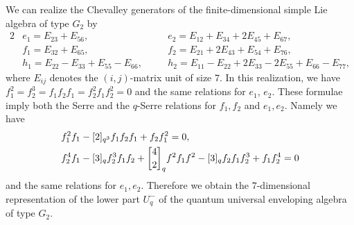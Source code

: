 \documentclass[12pt,a4paper]{article}
\theoremstyle{plain} %
\theoremstyle{definition} %
\theoremstyle{definition} %
\numberwithin{theorem}{section}
\numberwithin{equation}{section}
\numberwithin{figure}{section}
\numberwithin{table}{section}
\begin{document}
We can realize the Chevalley generators of 
the finite-dimensional simple Lie algebra of type $G_2$ by
\begin{alignat*}{2}
  & e_1 = E_{23}+E_{56}, \quad &
  & e_2 = E_{12}+E_{34}+2E_{45}+E_{67}, \\
  & f_1 = E_{32}+E_{65}, \quad &
  & f_2 = E_{21}+2E_{43}+E_{54}+E_{76}, \\
  & h_1 = E_{22}-E_{33}+E_{55}-E_{66}, \quad &
  & h_2 = E_{11}-E_{22}+2E_{33}-2E_{55}+E_{66}-E_{77},
\end{alignat*}
where $E_{ij}$ denotes the $(i,j)$-matrix unit of size $7$.
In this realization, we have
$f_1^2=f_2^3=f_1f_2f_1=f_2^2f_1f_2^2=0$ and
the same relations for $e_1$, $e_2$.
These formulae imply
both the Serre and the $q$-Serre relations 
for $f_1,f_2$ and $e_1,e_2$.
Namely we have
\begin{align*}
 &
 f_1^2f_1 - [2]_{q^3} f_1f_2f_1 + f_2f_1^2 = 0, 
 \\ &
 f_2^4f_1 - [3]_q f_2^3f_1f_2 
          + \qbinom{4}{2}_q f^2f_1f^2
          - [3]_q f_2f_1f_2^3        + f_1f_2^4 = 0
\end{align*}
and the same relations for $e_1,e_2$.
Therefore we obtain the $7$-dimensional representation
of the lower part $U_q^-$
of the quantum universal enveloping algebra of type $G_2$.
\end{document}

